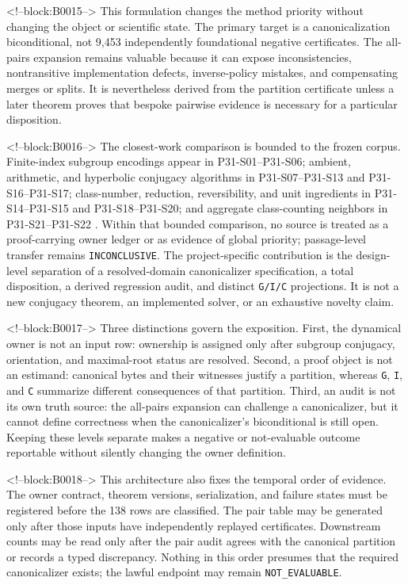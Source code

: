 \documentclass[11pt]{article}
\begin{document}
<!--block:B0015-->
This formulation changes the method priority without changing the object
or scientific state. The primary target is a canonicalization
biconditional, not 9,453 independently foundational negative
certificates. The all-pairs expansion remains valuable because it can
expose inconsistencies, nontransitive implementation defects,
inverse-policy mistakes, and compensating merges or splits. It is
nevertheless derived from the partition certificate unless a later
theorem proves that bespoke pairwise evidence is necessary for a
particular disposition.

<!--block:B0016-->
The closest-work comparison is bounded to the frozen corpus. Finite-index
subgroup encodings appear in P31-S01--P31-S06; ambient, arithmetic, and
hyperbolic conjugacy algorithms in P31-S07--P31-S13 and P31-S16--P31-S17;
class-number, reduction, reversibility, and unit ingredients in P31-S14--P31-S15
and P31-S18--P31-S20; and aggregate class-counting neighbors in P31-S21--P31-S22
\citep{P31-S01,P31-S02,P31-S03,P31-S04,P31-S05,P31-S06,P31-S07,P31-S08,P31-S09,P31-S10,P31-S11,P31-S12,P31-S13,P31-S14,P31-S15,P31-S16,P31-S17,P31-S18,P31-S19,P31-S20,P31-S21,P31-S22}.
Within that bounded comparison, no source is treated as a proof-carrying owner
ledger or as evidence of global priority; passage-level transfer remains
\texttt{INCONCLUSIVE}. The project-specific contribution is the design-level
separation of a resolved-domain canonicalizer specification, a total
disposition, a derived regression audit, and distinct \texttt{G/I/C}
projections. It is not a new conjugacy theorem, an implemented solver, or an
exhaustive novelty claim.

<!--block:B0017-->
Three distinctions govern the exposition. First, the dynamical owner is
not an input row: ownership is assigned only after subgroup conjugacy,
orientation, and maximal-root status are resolved. Second, a proof
object is not an estimand: canonical bytes and their witnesses justify a
partition, whereas \texttt{G}, \texttt{I}, and \texttt{C} summarize
different consequences of that partition. Third, an audit is not its
own truth source: the all-pairs expansion can challenge a canonicalizer,
but it cannot define correctness when the canonicalizer's biconditional
is still open. Keeping these levels separate makes a negative or
not-evaluable outcome reportable without silently changing the owner
definition.

<!--block:B0018-->
This architecture also fixes the temporal order of evidence. The owner
contract, theorem versions, serialization, and failure states must be
registered before the 138 rows are classified. The pair table may be
generated only after those inputs have independently replayed
certificates. Downstream counts may be read only after the pair audit
agrees with the canonical partition or records a typed discrepancy.
Nothing in this order presumes that the required canonicalizer exists;
the lawful endpoint may remain \texttt{NOT\_EVALUABLE}.
\end{document}
